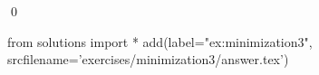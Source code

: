 
\begin{ex} 
  \label{ex:minimization3}
  
  \qed
\end{ex} 
\begin{python0}
from solutions import *
add(label="ex:minimization3",
    srcfilename='exercises/minimization3/answer.tex') 
\end{python0}
